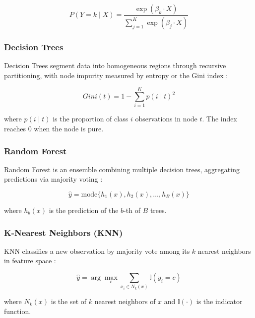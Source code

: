 \documentclass[alpha-refs,english]{RBCA_v3.0}
\begin{document}
\begin{equation}
P(Y=k \mid X) = \frac{\exp(\beta_k \cdot X)}{\sum_{j=1}^{K} \exp(\beta_j \cdot X)}
\label{eq:multinom}
\end{equation}

\subsubsection{Decision Trees}
Decision Trees segment data into homogeneous regions through recursive 
partitioning, with node impurity measured by entropy or the Gini index 
\citep{Breiman2017,Quinlan1986,Safavian1991}:

\begin{equation}
Gini(t) = 1 - \sum_{i=1}^{K} p(i \mid t)^2
\label{eq:gini}
\end{equation}

\noindent where $p(i \mid t)$ is the proportion of class $i$ observations in 
node $t$. The index reaches 0 when the node is pure.

\subsubsection{Random Forest}
Random Forest is an ensemble combining multiple decision trees, aggregating 
predictions via majority voting \citep{Breiman2001,Cutler2007}:

\begin{equation}
\hat{y} = \mathrm{mode}\{h_1(x), h_2(x), \ldots, h_B(x)\}
\label{eq:rf}
\end{equation}

\noindent where $h_b(x)$ is the prediction of the $b$-th of $B$ trees.

\subsubsection{K-Nearest Neighbors (KNN)}
KNN classifies a new observation by majority vote among its $k$ nearest 
neighbors in feature space \citep{Cover1967,Altman1992,Duda2001}:

\begin{equation}
\hat{y} = \arg\max_{c} \sum_{x_i \in N_k(x)} \mathbb{I}(y_i = c)
\label{eq:knn}
\end{equation}

\noindent where $N_k(x)$ is the set of $k$ nearest neighbors of $x$ and 
$\mathbb{I}(\cdot)$ is the indicator function.
\end{document}
